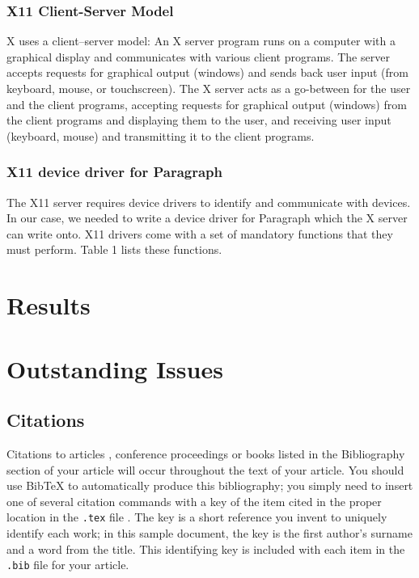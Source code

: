 \documentclass{acm_proc_article-sp}
\begin{document}
\subsubsection{X11 Client\--Server Model}
X uses a client–server model:  An X server program runs on a computer with a graphical display and communicates with various client programs. The server accepts requests for graphical output (windows) and sends back user input (from keyboard, mouse, or touchscreen). The X server acts as a go-between for the user and the client programs, accepting requests for graphical output (windows) from the client programs and displaying them to the user, and receiving user input (keyboard, mouse) and transmitting it to the client programs.

\subsubsection{X11 device driver for Paragraph}
The X11 server requires device drivers to identify and communicate with devices.
In our case, we needed to write a device driver for Paragraph which the X server can
write onto.
X11 drivers come with a set of mandatory functions that they must perform. Table
1 lists these functions.

\section{Results}
\section{Outstanding Issues}
\subsection{Citations}
Citations to articles \cite{bowman:reasoning, clark:pct, braams:babel, herlihy:methodology},
conference
proceedings \cite{clark:pct} or books \cite{salas:calculus, Lamport:LaTeX} listed
in the Bibliography section of your
article will occur throughout the text of your article.
You should use BibTeX to automatically produce this bibliography;
you simply need to insert one of several citation commands with
a key of the item cited in the proper location in
the \texttt{.tex} file \cite{Lamport:LaTeX}.
The key is a short reference you invent to uniquely
identify each work; in this sample document, the key is
the first author's surname and a
word from the title.  This identifying key is included
with each item in the \texttt{.bib} file for your article.
\end{document}
